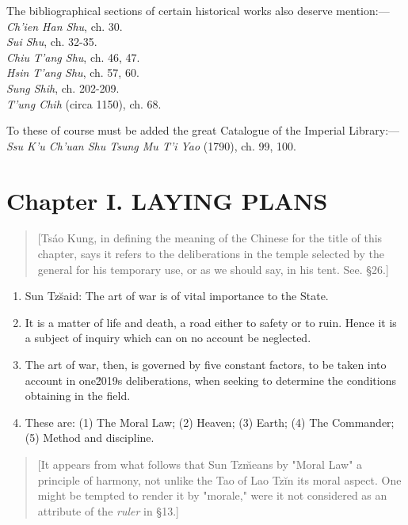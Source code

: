\documentclass[10pt,a4paper]{book}
\begin{document}
The bibliographical sections of certain historical works also deserve mention:---
\noindent\textit{Ch’ien Han Shu}, ch. 30. \\
\textit{Sui Shu}, ch. 32-35. \\
\textit{Chiu T’ang Shu}, ch. 46, 47. \\
\textit{Hsin T’ang Shu}, ch. 57, 60. \\
\textit{Sung Shih}, ch. 202-209. \\
\textit{T’ung Chih} (circa 1150), ch. 68.

To these of course must be added the great Catalogue of the Imperial Library:--- \\
\indent\textit{Ssu K’u Ch’uan Shu Tsung Mu T’i Yao} (1790), ch. 99, 100.

\chapter{Chapter I. LAYING PLANS}

{\small
\begin{quote}
[Ts\'ao Kung, in defining the meaning of the Chinese for the title of this chapter, says it refers to the deliberations in the temple selected by the general for his temporary use, or as we should say, in his tent. See. \S 26.]
\end{quote}
}

\begin{enumerate}[leftmargin=*, label=\arabic*., wide=0pt]

\item Sun Tz\u said: The art of war is of vital importance to the State.

\item It is a matter of life and death, a road either to safety or to ruin. Hence it is a subject of inquiry which can on no account be neglected.

\item The art of war, then, is governed by five constant factors, to be taken into account in one\u2019s deliberations, when seeking to determine the conditions obtaining in the field.

\item These are: (1) The Moral Law; (2) Heaven; (3) Earth; (4) The Commander; (5) Method and discipline.

\end{enumerate}

{\small
\begin{quote}
[It appears from what follows that Sun Tz\u means by "Moral Law" a principle of harmony, not unlike the Tao of Lao Tz\u in its moral aspect. One might be tempted to render it by "morale," were it not considered as an attribute of the \textit{ruler} in \S 13.]
\end{quote}
}
\end{document}
